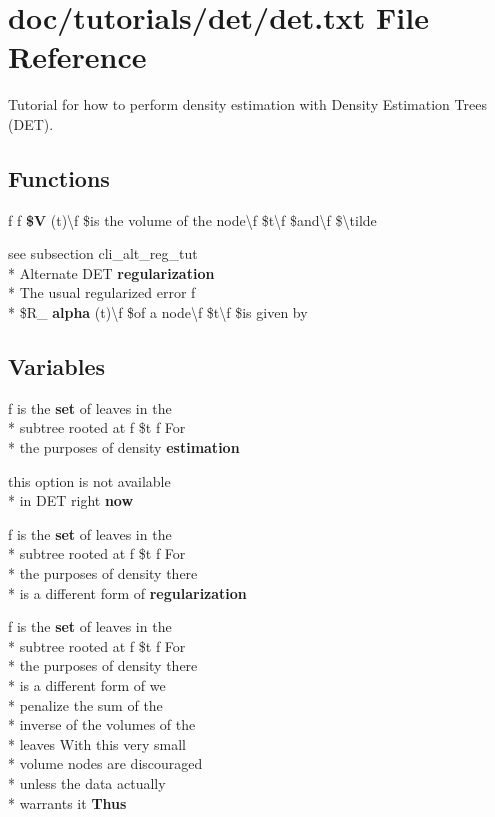 \section{doc/tutorials/det/det.txt File Reference}
\label{det_8txt}


Tutorial for how to perform density estimation with Density Estimation Trees (D\-E\-T).  


\subsection*{Functions}
\begin{DoxyCompactItemize}
\item 
f f {\bf \$\-V} (t)\textbackslash{}f \$is the volume of the node\textbackslash{}f \$t\textbackslash{}f \$and\textbackslash{}f \$\textbackslash{}tilde
\item 
see subsection cli\-\_\-alt\-\_\-reg\-\_\-tut \\*
Alternate D\-E\-T {\bf regularization} \\*
The usual regularized error f \\*
\$R\-\_\- {\bf alpha} (t)\textbackslash{}f \$of a node\textbackslash{}f \$t\textbackslash{}f \$is given by
\end{DoxyCompactItemize}
\subsection*{Variables}
\begin{DoxyCompactItemize}
\item 
f is the {\bf set} of leaves in the \\*
subtree rooted at f \$t f For \\*
the purposes of density {\bf estimation}
\item 
this option is not available \\*
in D\-E\-T right {\bf now}
\item 
f is the {\bf set} of leaves in the \\*
subtree rooted at f \$t f For \\*
the purposes of density there \\*
is a different form of {\bf regularization}
\item 
f is the {\bf set} of leaves in the \\*
subtree rooted at f \$t f For \\*
the purposes of density there \\*
is a different form of we \\*
penalize the sum of the \\*
inverse of the volumes of the \\*
leaves With this very small \\*
volume nodes are discouraged \\*
unless the data actually \\*
warrants it {\bf Thus}
\end{DoxyCompactItemize}


